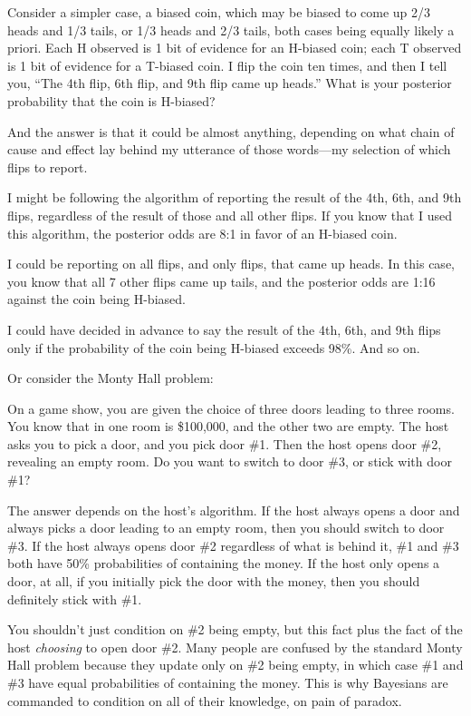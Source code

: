 {
 Consider a simpler case, a biased coin, which may be biased to
come up 2/3 heads and 1/3 tails, or 1/3 heads and 2/3 tails, both cases
being equally likely a priori. Each H observed is 1 bit of evidence for
an H-biased coin; each T observed is 1 bit of evidence for a T-biased
coin. I flip the coin ten times, and then I tell you,
``The 4th flip, 6th flip, and 9th flip came up
heads.'' What is your posterior probability that the
coin is H-biased?}

{
 And the answer is that it could be almost anything, depending on
what chain of cause and effect lay behind my utterance of those
words---my selection of which flips to report.}

{
 I might be following the algorithm of reporting the result of the
4th, 6th, and 9th flips, regardless of the result of those and all
other flips. If you know that I used this algorithm, the posterior odds
are 8:1 in favor of an H-biased coin.}

{
 I could be reporting on all flips, and only flips, that came up
heads. In this case, you know that all 7 other flips came up tails, and
the posterior odds are 1:16 against the coin being H-biased.}

{
 I could have decided in advance to say the result of the 4th, 6th,
and 9th flips only if the probability of the coin being H-biased
exceeds 98\%. And so on.}

{
 Or consider the Monty Hall problem:}

{
 On a game show, you are given the choice of three doors leading to
three rooms. You know that in one room is \$100,000, and the other two
are empty. The host asks you to pick a door, and you pick door \#1.
Then the host opens door \#2, revealing an empty room. Do you want to
switch to door \#3, or stick with door \#1?}

{
 The answer depends on the host's algorithm. If the
host always opens a door and always picks a door leading to an empty
room, then you should switch to door \#3. If the host always opens door
\#2 regardless of what is behind it, \#1 and \#3 both have 50\%
probabilities of containing the money. If the host only opens a door,
at all, if you initially pick the door with the money, then you should
definitely stick with \#1.}

{
 You shouldn't just condition on \#2 being empty,
but this fact plus the fact of the host \textit{choosing} to open door
\#2. Many people are confused by the standard Monty Hall problem
because they update only on \#2 being empty, in which case \#1 and \#3
have equal probabilities of containing the money. This is why Bayesians
are commanded to condition on all of their knowledge, on pain of
paradox.}

